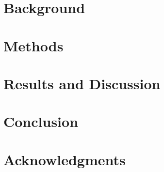 \documentclass[colorlinks,balance]{asmeconf}
\begin{document}
\blindtext[4]


\section{Background}\label{sec:background}

\blindtext[4]


\section{Methods}\label{sec:methods}

\blindtext[4]


\section{Results and Discussion}\label{sec:results}

\blindtext[4]


\section{Conclusion}\label{sec:conclusion}

\blindtext[2]



\section*{Acknowledgments}
\blindtext[1]





\end{document}
